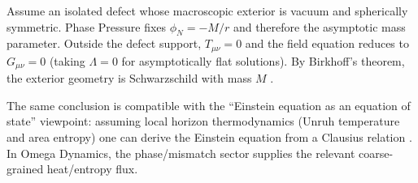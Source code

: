 \begin{corollary}
Assume an isolated defect whose macroscopic exterior is vacuum and spherically symmetric. Phase Pressure fixes $\phi_N=-M/r$ and therefore the asymptotic mass parameter. Outside the defect support, $T_{\mu\nu}=0$ and the field equation reduces to $G_{\mu\nu}=0$ (taking $\Lambda=0$ for asymptotically flat solutions). By Birkhoff's theorem, the exterior geometry is Schwarzschild with mass $M$ \cite{MisnerThorneWheeler1973, Wald1984}.
\end{corollary}

\begin{remark}
The same conclusion is compatible with the ``Einstein equation as an equation of state'' viewpoint: assuming local horizon thermodynamics (Unruh temperature and area entropy) one can derive the Einstein equation from a Clausius relation \cite{Jacobson1995}. In Omega Dynamics, the phase/mismatch sector supplies the relevant coarse-grained heat/entropy flux.
\end{remark}
